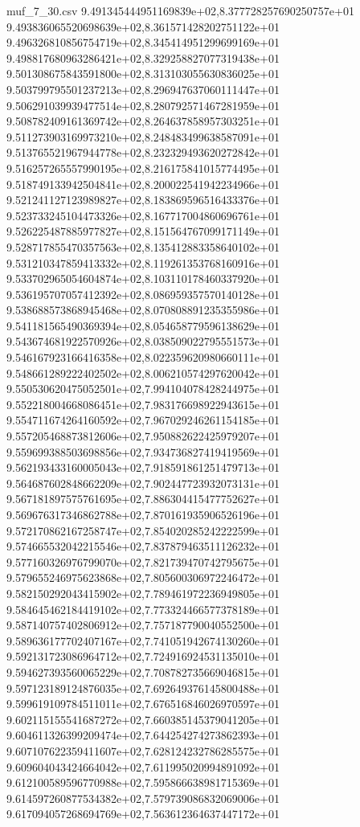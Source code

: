 \begin{filecontents*}{muf_7_30.csv}
9.491345444951169839e+02,8.377728257690250757e+01
9.493836065520698639e+02,8.361571428202751122e+01
9.496326810856754719e+02,8.345414951299699169e+01
9.498817680963286421e+02,8.329258827077319438e+01
9.501308675843591800e+02,8.313103055630836025e+01
9.503799795501237213e+02,8.296947637060111447e+01
9.506291039939477514e+02,8.280792571467281959e+01
9.508782409161369742e+02,8.264637858957303251e+01
9.511273903169973210e+02,8.248483499638587091e+01
9.513765521967944778e+02,8.232329493620272842e+01
9.516257265557990195e+02,8.216175841015774495e+01
9.518749133942504841e+02,8.200022541942234966e+01
9.521241127123989827e+02,8.183869596516433376e+01
9.523733245104473326e+02,8.167717004860696761e+01
9.526225487885977827e+02,8.151564767099171149e+01
9.528717855470357563e+02,8.135412883358640102e+01
9.531210347859413332e+02,8.119261353768160916e+01
9.533702965054604874e+02,8.103110178460337920e+01
9.536195707057412392e+02,8.086959357570140128e+01
9.538688573868945468e+02,8.070808891235355986e+01
9.541181565490369394e+02,8.054658779596138629e+01
9.543674681922570926e+02,8.038509022795551573e+01
9.546167923166416358e+02,8.022359620980660111e+01
9.548661289222402502e+02,8.006210574297620042e+01
9.550530620475052501e+02,7.994104078428244975e+01
9.552218004668086451e+02,7.983176698922943615e+01
9.554711674264160592e+02,7.967029246261154185e+01
9.557205468873812606e+02,7.950882622425979207e+01
9.559699388503698856e+02,7.934736827419419569e+01
9.562193433160005043e+02,7.918591861251479713e+01
9.564687602848662209e+02,7.902447723932073131e+01
9.567181897575761695e+02,7.886304415477752627e+01
9.569676317346862788e+02,7.870161935906526196e+01
9.572170862167258747e+02,7.854020285242222599e+01
9.574665532042215546e+02,7.837879463511126232e+01
9.577160326976799070e+02,7.821739470742795675e+01
9.579655246975623868e+02,7.805600306972246472e+01
9.582150292043415902e+02,7.789461972236949805e+01
9.584645462184419102e+02,7.773324466577378189e+01
9.587140757402806912e+02,7.757187790040552500e+01
9.589636177702407167e+02,7.741051942674130260e+01
9.592131723086964712e+02,7.724916924531135010e+01
9.594627393560065229e+02,7.708782735669046815e+01
9.597123189124876035e+02,7.692649376145800488e+01
9.599619109784511011e+02,7.676516846026970597e+01
9.602115155541687272e+02,7.660385145379041205e+01
9.604611326399209474e+02,7.644254274273862393e+01
9.607107622359411607e+02,7.628124232786285575e+01
9.609604043424664042e+02,7.611995020994891092e+01
9.612100589596770988e+02,7.595866638981715369e+01
9.614597260877534382e+02,7.579739086832069006e+01
9.617094057268694769e+02,7.563612364637447172e+01

\end{filecontents*}

